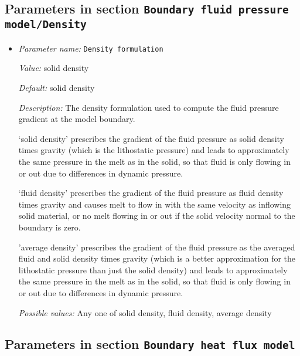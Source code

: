 \subsection{Parameters in section \tt Boundary fluid pressure model/Density}
\label{parameters:Boundary_20fluid_20pressure_20model/Density}

\begin{itemize}
\item {\it Parameter name:} {\tt Density formulation}
\label{parameters:Boundary fluid pressure model/Density/Density formulation}
\label{parameters:Boundary_20fluid_20pressure_20model/Density/Density_20formulation}


{\it Value:} solid density


{\it Default:} solid density


{\it Description:} The density formulation used to compute the fluid pressure gradient at the model boundary.

`solid density' prescribes the gradient of the fluid pressure as solid density times gravity (which is the lithostatic pressure) and leads to approximately the same pressure in the melt as in the solid, so that fluid is only flowing in or out due to differences in dynamic pressure.

`fluid density' prescribes the gradient of the fluid pressure as fluid density times gravity and causes melt to flow in with the same velocity as inflowing solid material, or no melt flowing in or out if the solid velocity normal to the boundary is zero.

'average density' prescribes the gradient of the fluid pressure as the averaged fluid and solid density times gravity (which is a better approximation for the lithostatic pressure than just the solid density) and leads to approximately the same pressure in the melt as in the solid, so that fluid is only flowing in or out due to differences in dynamic pressure.


{\it Possible values:} Any one of solid density, fluid density, average density
\end{itemize}

\subsection{Parameters in section \tt Boundary heat flux model}
\label{parameters:Boundary_20heat_20flux_20model}

